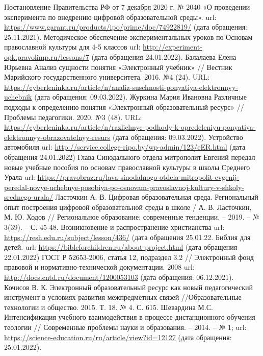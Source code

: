 \newpage
\large
\begin{thebibliography}{99}
  Постановление Правительства РФ от 7 декабря 2020 г. № 2040 «О проведении эксперимента по внедрению цифровой образовательной среды». url: \url{https://www.garant.ru/products/ipo/prime/doc/74922819/} (дата обращения: 25.11.2021).
  Методическое обеспечение экспериментальных уроков по Основам православной культуры для 4-5 классов url: \url{http://experiment-opk.pravolimp.ru/lessons/7} (дата обращения 24.01.2022).
 Балалаева Елена Юрьевна Анализ сущности понятия «Электронный учебник» // Вестник Марийского государственного университета. 2016. №4 (24). URL: \url{https://cyberleninka.ru/article/n/analiz-suschnosti-ponyatiya-elektronnyy-uchebnik} (дата обращения: 09.03.2022).
 Журкина Мария Ивановна Различные подходы к определению понятия «Электронный образовательный ресурс» // Проблемы педагогики. 2020. №3 (48). URL: \url {https://cyberleninka.ru/article/n/razlichnye-podhody-k-opredeleniyu-ponyatiya-elektronnyy-obrazovatelnyy-resurs} (дата обращения: 09.03.2022).
  Устройство автомобиля url: \url{http://service.college-ripo.by/wp-admin/123/eER.html} (дата обращения 24.01.2022)
 Глава Синодального отдела митрополит Евгений передал новые учебные пособия по основам православной культуры в школы Среднего Урала url: \url{https://pravobraz.ru/lava-sinodalnogo-otdela-mitropolit-evgenij-peredal-novye-uchebnye-posobiya-po-osnovam-pravoslavnoj-kultury-v-shkoly-srednego-urala/}
  Ласточкин А. В. Цифровая образовательная среда. Региональный опыт построения цифровой образовательной среды в школе / А. В. Ласточкин, М. Ю. Ходов // Региональное образование: современные тенденции. – 2019. – № 3(39). – С. 45-48.
  Возникновение и распространение христианства url: \url{https://resh.edu.ru/subject/lesson/436/} (дата обращения 25.01.22.
  Библия для детей. url: \url{https://bibleforchildren.ru/about-project.html} (дата обращения 22.01.2022)
  ГОСТ Р 52653-2006, статья 12, подраздел 3.2 // Электронный фонд правовой и нормативно-технической документации. 2008 url: \url{http://docs.cntd.ru/document/1200053103} (дата обращения: 06.12.2021).
  Кочисов В. К. Электронный образовательный ресурс как новый педагогический инструмент в условиях развития межпредметных связей //Образовательные технологии и общество. 2015. Т. 18. № 4. С. 615.
  Шевардина М.С. Интенсификация учебного взаимодействия в процессе дистанционного обучения теологии // Современные проблемы науки и образования. – 2014. – № 1; url: \url{https://science-education.ru/ru/article/view?id=12127} (дата обращения: 25.01.2022).

\end{thebibliography}
